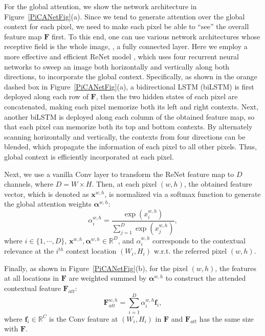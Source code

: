 \documentclass[10pt,twocolumn,letterpaper]{article}
\begin{document}
For the global attention, we show the network architecture in Figure~\ref{PiCANetFig}(a). Since we tend to generate attention over the global context for each pixel, we need to make each pixel be able to ``see'' the overall feature map $\bm{F}$ first. To this end, one can use various network architectures whose receptive field is the whole image, \eg, a fully connected layer. Here we employ a more effective and efficient ReNet model \cite{visin2015renet}, which uses four recurrent neural networks to sweep an image both horizontally and vertically along both directions, to incorporate the global context. Specifically, as shown in the orange dashed box in Figure~\ref{PiCANetFig}(a), a bidirectional LSTM (biLSTM) \cite{graves2013bilstm} is first deployed along each row of $\bm{F}$, then the two hidden states of each pixel are concatenated, making each pixel memorize both its left and right contexts. Next, another biLSTM is deployed along each column of the obtained feature map, so that each pixel can memorize both its top and bottom contexts. By alternately scanning horizontally and vertically, the contexts from four directions can be blended, which propagate the information of each pixel to all other pixels. Thus, global context is efficiently incorporated at each pixel.

Next, we use a vanilla Conv layer to transform the ReNet feature map to $D$ channels, where $D=W\times H$. Then, at each pixel $(w,h)$, the obtained feature vector, which is denoted as $\bm{x}^{w,h}$, is normalized via a softmax function to generate the global attention weights $\bm{\alpha}^{w,h}$:
\begin{equation} \label{attSoftmax}
\alpha_{i}^{w,h}=\frac{\exp{(x_{i}^{w,h})}}{\sum_{j=1}^D\exp{(x_{j}^{w,h})}},
\end{equation}
where $i\in{\{1,\cdots,D\}}$, $\bm{x}^{w,h},\bm{\alpha}^{w,h}\in{\mathbb{R}^D}$, and $\alpha_{i}^{w,h}$ corresponds to the contextual relevance at the $i^{th}$ context location $(W_i, H_i)$ w.r.t. the referred pixel $(w,h)$.

Finally, as shown in Figure~\ref{PiCANetFig}(b), for the pixel $(w,h)$, the features at all locations in $\bm{F}$ are weighted summed by $\bm{\alpha}^{w,h}$ to construct the attended contextual feature $\bm{F}_{att}$:
\begin{equation} \label{globalAtt}
\bm{F}_{att}^{w,h}=\sum_{i=1}^D\alpha_{i}^{w,h}\bm{f}_{i},
\end{equation}
where $\bm{f}_{i}\in{\mathbb{R}^C}$ is the Conv feature at $(W_i, H_i)$ in $\bm{F}$ and $\bm{F}_{att}$ has the same size with $\bm{F}$.
\end{document}
